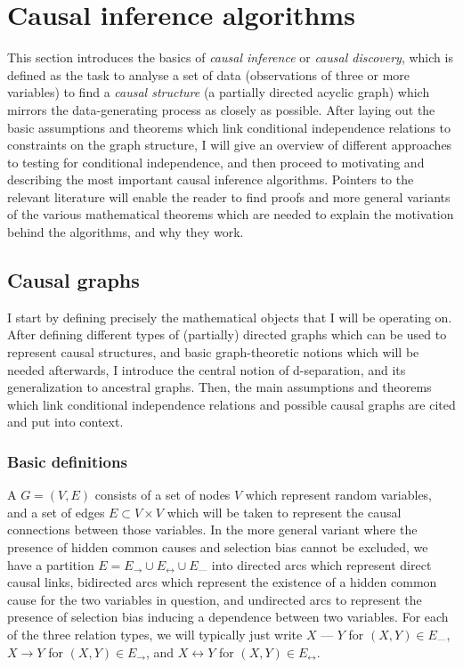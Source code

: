 \section{Causal inference algorithms}\label{sec:3:2}
This section introduces the basics of \textit{causal inference} or \textit{causal discovery}, which is defined as the task to analyse a set of data (observations of three or more variables) to find a \textit{causal structure} (a partially directed acyclic graph) which mirrors the data-generating process as closely as possible. After laying out the basic assumptions and theorems which link conditional independence relations to constraints on the graph structure, I will give an overview of different approaches to testing for conditional independence, and then proceed to motivating and describing the most important causal inference algorithms. Pointers to the relevant literature will enable the reader to find proofs and more general variants of the various mathematical theorems which are needed to explain the motivation behind the algorithms, and why they work.

\subsection{Causal graphs}\label{sec:3.2.1}
I start by defining precisely the mathematical objects that I will be operating on. After defining different types of (partially) directed graphs which can be used to represent causal structures, and basic graph-theoretic notions which will be needed afterwards, I introduce the central notion of d-separation, and its generalization to ancestral graphs. Then, the main assumptions and theorems which link conditional independence relations and possible causal graphs are cited and put into context.

\subsubsection{Basic definitions}
A  $G = (V,E)$ consists of a set of nodes $V$ which represent random variables, and a set of edges $E \subset V \times V$ which will be taken to represent the causal connections between those variables. In the more general variant where the presence of hidden common causes and selection bias cannot be excluded, we have a partition $E = E_\rightarrow \cup E_\leftrightarrow \cup E_\text{---}$ into directed arcs which represent direct causal links, bidirected arcs which represent the existence of a hidden common cause for the two variables in question, and undirected arcs to represent the presence of selection bias inducing a dependence between two variables. For each of the three relation types, we will typically just write $X \text{ --- } Y$ for $(X,Y) \in E_\text{---}$, $X \rightarrow Y$ for $(X,Y) \in E_\rightarrow$, and $X \leftrightarrow Y$ for $(X,Y) \in E_\leftrightarrow$.

